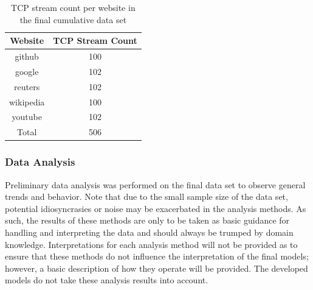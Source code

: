 \documentclass[10pt,sigconf,letterpaper,nonacm]{acmart}
\begin{document}
\begin{table}[h]
  \caption{TCP stream count per website in the final cumulative data set}
  \label{tab:dataSize}
  \begin{tabular}{cc}
    \toprule
    Website & TCP Stream Count \\
    \midrule
    github & 100 \\
    google & 102 \\
    reuters & 102 \\
    wikipedia & 100 \\
    youtube & 102 \\
    \midrule
    Total & 506 \\
    \bottomrule
  \end{tabular}
\end{table}

\subsubsection{Data Analysis}

Preliminary data analysis was performed on the final data set to observe general trends and behavior.
Note that due to the small sample size of the data set, potential idiosyncrasies or noise may be exacerbated in the analysis methods.
As such, the results of these methods are only to be taken as basic guidance for handling and interpreting the data and should always be trumped by domain knowledge.
Interpretations for each analysis method will not be provided as to ensure that these methods do not influence the interpretation of the final models; however, a basic description of how they operate will be provided.
The developed models do not take these analysis results into account.
\end{document}
